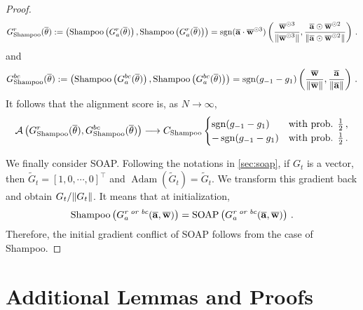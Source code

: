 \begin{proof}
\begin{align*}
    G_{\rm Shampoo}^r(\overline{\theta}): = \left({\rm Shampoo}\left(G_a^{r}(\overline{\theta})\right),{\rm Shampoo}\left(G_a^r(\overline{\theta})\right)\right) = \operatorname{sgn}(\overline{\mathbf{a}} \cdot \overline{\mathbf{w}}^{\odot 3}) \left(\frac{\overline{\mathbf{w}}^{\odot 3}}{\|\overline{\mathbf{w}}^{\odot 3}\|},\frac{ \overline{\mathbf{a}} \odot \overline{\mathbf{w}}^{\odot 2}}{\| \overline{\mathbf{a}} \odot \overline{\mathbf{w}}^{\odot 2}\|} \right)\,.
\end{align*}
and 
\begin{align*}
    G_{\rm Shampoo}^{bc}(\overline{\theta}): = \left({\rm Shampoo}\left(G_a^{bc}(\overline{\theta})\right),{\rm Shampoo}\left(G_a^{bc}(\overline{\theta})\right)\right) = \operatorname{sgn}(g_{-1} - g_1)\left(\frac{\overline{\mathbf{w}}}{\|\overline{\mathbf{w}}\|},\frac{\overline{\mathbf{a}}}{\|\overline{\mathbf{a}}\|}\right)\,.
\end{align*}
It follows that the  alignment score is, as $N \to \infty$, 
\begin{align*}
    \mathcal{A}\left( G^r_{\rm Shampoo}(\overline{\theta}) , G^{bc}_{\rm Shampoo}(\overline{\theta})  \right) \longrightarrow C_{{\rm Shampoo}}   \begin{cases}
        \operatorname{sgn} (g_{-1} - g_1)  & \text{with prob. $\frac{1}{2}$}\,, \\
       - \operatorname{sgn} (g_{-1} - g_1) & \text{with prob. $\frac{1}{2}$}\,.
      \end{cases}
\end{align*}

We finally consider SOAP. Following the notations in \cref{sec:soap}, if $G_t$ is a vector, then $\widetilde{G}_t = [1,0,\cdots, 0]^\top$ and $\operatorname{Adam}(\widetilde{G}_t) = \widetilde{G}_t$. We transform this gradient back and obtain $G_t/{\left\lVert G_t \right\lVert}$. It means that at initialization, 
\begin{equation*}
    {\rm Shampoo}\left(G_a^{\textit{r or bc}}(\overline{\mathbf{a}},\overline{\mathbf{w}})\right) =  {\rm SOAP}\left(G_a^{\textit{r or bc}}(\overline{\mathbf{a}},\overline{\mathbf{w}})\right)\,.
\end{equation*}
Therefore, the initial gradient conflict of SOAP follows from the case of Shampoo. 

\end{proof}


\section{Additional Lemmas and Proofs}

